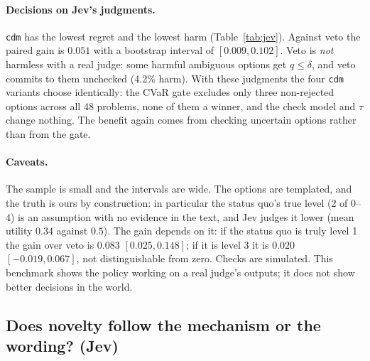 \documentclass[11pt]{article}
\theoremstyle{definition}
\begin{document}
\paragraph{Decisions on Jev's judgments.} \texttt{cdm} has the lowest regret and the lowest harm (Table~\ref{tab:jev}).
Against veto the paired gain is $0.051$ with a bootstrap interval of $[0.009,0.102]$. Veto is
\emph{not} harmless with a real judge: some harmful ambiguous options get $q\le\delta$, and veto
commits to them unchecked (4.2\% harm). With these judgments the four \texttt{cdm} variants choose
identically: the CVaR gate excludes only three non-rejected options across all 48 problems, none of
them a winner, and the check model and $\tau$ change nothing. The benefit again comes from checking
uncertain options rather than from the gate.

\paragraph{Caveats.} The sample is small and the intervals are wide. The options are templated, and
the truth is ours by construction: in particular the status quo's true level (2 of 0--4) is an
assumption with no evidence in the text, and Jev judges it lower (mean utility $0.34$ against
$0.5$). The gain depends on it: if the status quo is truly level 1 the gain over veto is $0.083$
$[0.025,0.148]$; if it is level 3 it is $0.020$ $[-0.019,0.067]$, not distinguishable from zero.
Checks are simulated. This benchmark shows the policy working on a real judge's outputs; it does not
show better decisions in the world.

\subsection{Does novelty follow the mechanism or the wording? (Jev)}\label{sec:mechjev}
\end{document}
